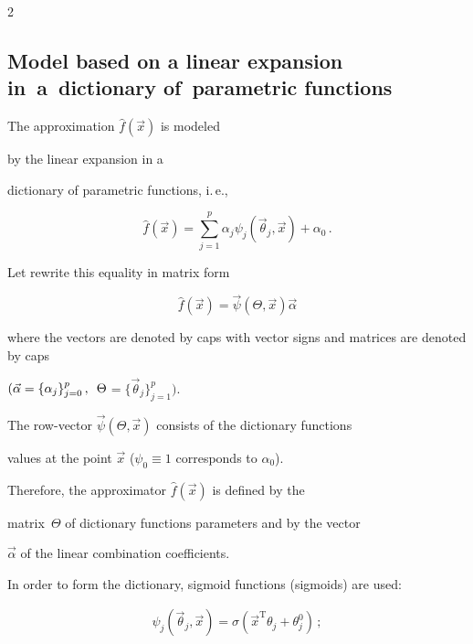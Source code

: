 \begin{multicols}{2}
\subsection{Model based on a linear expansion in~a~dictionary of~parametric functions}

\label{model}



\noindent

The approximation $\hat f\left( {\vec x} \right)$ is modeled

by the linear expansion in a 

dictionary of parametric functions, i.\,e.,

$$ 

\hat f\left({\vec x}\right) = \sum\limits_{j = 1}^p \alpha_j 

\psi_j\left( {\vec \theta_j},  {\vec x} \right) + \alpha_0\,.

$$

Let rewrite this equality in matrix form

$$

\hat f \left( {\vec x} \right) = {\vec \psi} \left( {\Theta}, {\vec x} \right) {\vec \alpha}

$$ 

where the vectors are denoted by caps with vector signs and matrices are denoted by caps 

$({\vec \alpha} = \{ \alpha_j \}_{j = 0}^p\,,\enskip \Theta$\linebreak $ = \{ \vec \theta_j \}_{j = 1}^p)$.

The row-vector ${\vec \psi} \left( {\Theta}, {\vec x} \right)$ consists of the dictionary functions 

values at the point ${\vec x}$ ($\psi_0 \equiv 1$ corresponds to $\alpha_0$).

Therefore, the approximator $\hat f \left( {\vec x}\right)$ is defined by the 

matrix~$\Theta$ of dictionary functions parameters and by the vector

  ${\vec \alpha}$ of the linear combination coefficients.

In order to form the dictionary, sigmoid functions (sigmoids) are used:

\begin{gather*}

  \psi_j\left( {\vec \theta_j}, {\vec x} \right) =

        \sigma\left({\vec x}^{\mathrm{T}}\theta_j + \theta_j^0\right)\,;\\


\end{gather*}
\end{multicols}
